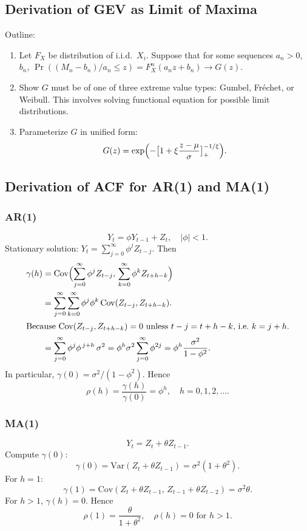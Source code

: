 \documentclass[11pt]{article}
\begin{document}
\subsection{Derivation of GEV as Limit of Maxima}
\noindent Outline:
\begin{enumerate}
  \item Let \(F_X\) be distribution of i.i.d.\ \(X_i\). Suppose that for some sequences \(a_n>0\), \(b_n\), 
    \(\Pr((M_n - b_n)/a_n \le z) = F_X^n(a_n z + b_n)\to G(z)\).
  \item Show \(G\) must be of one of three extreme value types: Gumbel, Fréchet, or Weibull. This involves solving functional equation for possible limit distributions.
  \item Parameterize \(G\) in unified form:
    \[
      G(z) = \exp\Bigl(-\bigl[1 + \xi\frac{z - \mu}{\sigma}\bigr]_+^{-1/\xi}\Bigr).
    \]
\end{enumerate}

\subsection{Derivation of ACF for AR(1) and MA(1)}
\subsubsection{AR(1)}
\[
Y_t = \phi Y_{t-1} + Z_t, \quad |\phi|<1.
\]
\noindent Stationary solution: \(Y_t = \sum_{j=0}^{\infty} \phi^j Z_{t-j}\). Then
\begin{align*}
\gamma(h) 
&= \mathrm{Cov}\Bigl(\sum_{j=0}^\infty \phi^j Z_{t-j},\,\sum_{k=0}^\infty \phi^k Z_{t+h-k}\Bigr) \\
&= \sum_{j=0}^\infty \sum_{k=0}^\infty \phi^j \phi^k \,\mathrm{Cov}(Z_{t-j},Z_{t+h-k}). \\
\intertext{Because \(\mathrm{Cov}(Z_{t-j},Z_{t+h-k}) = 0\) unless \(t-j = t+h-k\), i.e.\ \(k = j + h\).}
&= \sum_{j=0}^\infty \phi^j \phi^{\,j+h} \,\sigma^2 
= \phi^h \sigma^2 \sum_{j=0}^\infty \phi^{2j} 
= \phi^h \frac{\sigma^2}{1 - \phi^2}.
\end{align*}
\noindent In particular, \(\gamma(0) = \sigma^2/(1-\phi^2)\). Hence
\[
\rho(h) = \frac{\gamma(h)}{\gamma(0)} = \phi^h, \quad h=0,1,2,\dots.
\]

\subsubsection{MA(1)}
\[
Y_t = Z_t + \theta Z_{t-1}.
\]
\noindent Compute \(\gamma(0)\):
\[
\gamma(0) 
= \mathrm{Var}(Z_t + \theta Z_{t-1}) 
= \sigma^2(1 + \theta^2).
\]
\noindent For \(h=1\):
\[
\gamma(1) 
= \mathrm{Cov}(Z_t + \theta Z_{t-1},\,Z_{t-1} + \theta Z_{t-2})
= \sigma^2 \theta.
\]
\noindent For \(h>1\), \(\gamma(h)=0\). Hence
\[
\rho(1) = \frac{\theta}{1 + \theta^2}, 
\quad \rho(h) = 0 \text{ for } h>1.
\]
\end{document}
